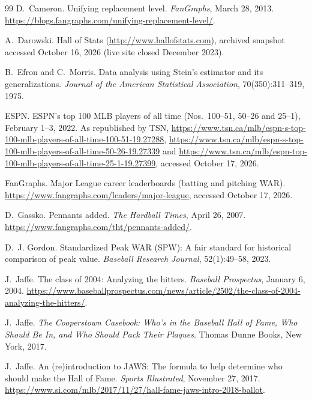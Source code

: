 \documentclass[11pt,letterpaper]{article}
\theoremstyle{plain}
\theoremstyle{definition}
\theoremstyle{remark}
\begin{document}
\begin{thebibliography}{99}
D.~Cameron.
\newblock Unifying replacement level.
\newblock \emph{FanGraphs}, March 28, 2013. \url{https://blogs.fangraphs.com/unifying-replacement-level/}.

A.~Darowski.
\newblock Hall of Stats (\url{http://www.hallofstats.com}), archived snapshot accessed October 16, 2026 (live site closed December 2023).

B.~Efron and C.~Morris.
\newblock Data analysis using {Stein's} estimator and its generalizations.
\newblock \emph{Journal of the American Statistical Association}, 70(350):311--319, 1975.

{ESPN}.
\newblock ESPN's top 100 MLB players of all time (Nos.\ 100--51, 50--26 and 25--1), February 1--3, 2022.
\newblock As republished by TSN, \url{https://www.tsn.ca/mlb/espn-s-top-100-mlb-players-of-all-time-100-51-19.27288}, \url{https://www.tsn.ca/mlb/espn-s-top-100-mlb-players-of-all-time-50-26-19.27339} and \url{https://www.tsn.ca/mlb/espn-top-100-mlb-players-of-all-time-25-1-19.27399}, accessed October 17, 2026.

{FanGraphs}.
\newblock Major League career leaderboards (batting and pitching WAR).
\newblock \url{https://www.fangraphs.com/leaders/major-league}, accessed October 17, 2026.

D.~Gassko.
\newblock Pennants added.
\newblock \emph{The Hardball Times}, April 26, 2007. \url{https://www.fangraphs.com/tht/pennants-added/}.

D.~J. Gordon.
\newblock Standardized Peak WAR (SPW): A fair standard for historical comparison of peak value.
\newblock \emph{Baseball Research Journal}, 52(1):49--58, 2023.

J.~Jaffe.
\newblock The class of 2004: Analyzing the hitters.
\newblock \emph{Baseball Prospectus}, January 6, 2004. \url{https://www.baseballprospectus.com/news/article/2502/the-class-of-2004-analyzing-the-hitters/}.

J.~Jaffe.
\newblock \emph{The Cooperstown Casebook: Who's in the Baseball Hall of Fame, Who Should Be In, and Who Should Pack Their Plaques}.
\newblock Thomas Dunne Books, New York, 2017.

J.~Jaffe.
\newblock An (re)introduction to JAWS: The formula to help determine who should make the Hall of Fame.
\newblock \emph{Sports Illustrated}, November 27, 2017. \url{https://www.si.com/mlb/2017/11/27/hall-fame-jaws-intro-2018-ballot}.


\end{thebibliography}
\end{document}
